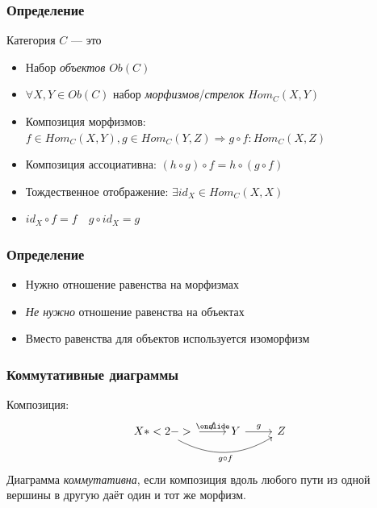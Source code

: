 \documentclass{beamer}
\begin{document}
\begin{frame}
\frametitle{Определение}
\begin{block}{Категория \begin{math}C\end{math} --- это}
\begin{itemize}
\pause
\item Набор \textit{объектов} \begin{math}Ob(C)\end{math}
\pause
\item \begin{math}\forall X,Y \in Ob(C) \end{math} набор \textit{морфизмов}/\textit{стрелок} \begin{math}Hom_C(X,Y)\end{math}
\pause
\item Композиция морфизмов: \begin{math}f\in Hom_C(X,Y), g \in Hom_C(Y,Z) \Rightarrow g\circ f:Hom_C(X,Z)\end{math}
\end{itemize}
\end{block}
\pause
\begin{itemize}
\item Композиция ассоциативна: \begin{math}(h\circ g)\circ f = h\circ (g\circ f)\end{math}
\pause
\item Тождественное отображение: \begin{math}\exists id_X\in Hom_C(X,X)\end{math}
\item \begin{math}id_X \circ f = f \quad g \circ id_X = g\end{math}
\end{itemize}
\end{frame}

\begin{frame}
\frametitle{Определение}
\begin{itemize}
\item Нужно отношение равенства на морфизмах
\item \textit{Не нужно} отношение равенства на объектах
\pause
\item Вместо равенства для объектов используется изоморфизм
\end{itemize}
\end{frame}

\begin{frame}[fragile]
\frametitle{Коммутативные диаграммы}
Композиция:
\begin{equation}
\begin{tikzcd}
X \arrow{r}{f} \onslide*<2->{\arrow[bend right]{rr}[swap]{g\circ f}} & Y \arrow{r}{g} & Z
\end{tikzcd}
\end{equation}
\pause
Диаграмма \textit{коммутативна}, если композиция вдоль любого пути из одной вершины в другую даёт один и тот же морфизм.
\end{frame}
\end{document}
